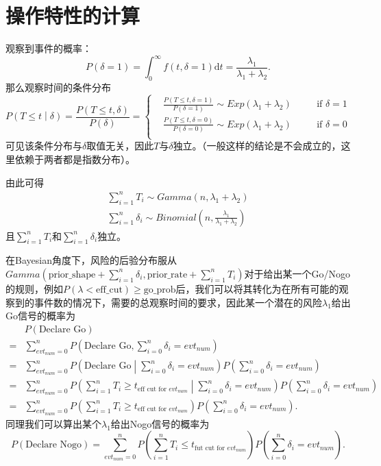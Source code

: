 \documentclass[a4paper,12pt]{article}
\begin{document}
\section{操作特性的计算}
\label{sec:computing_oc}

观察到事件的概率：
\[
  P\left(\delta = 1\right) = \int_0^\infty f\left(t, \delta = 1\right)\mathrm{d}t
  = \frac{\lambda_1}{\lambda_1 + \lambda_2}
  .
\]
那么观察时间的条件分布
\[
  P\left(T \leq t\middle|\delta\right) = \frac{P\left(T\leq t, \delta\right)}{P\left(\delta\right)}
  = \left\{
    \begin{aligned}
          & \frac{P\left(T\leq t, \delta = 1\right)}{P\left(\delta = 1\right)}
    \sim Exp\left(\lambda_1 + \lambda_2\right)
    &&\quad \text{if } \delta = 1    \\
    & \frac{P\left(T\leq t, \delta = 0\right)}{P\left(\delta = 0\right)}
    \sim Exp\left(\lambda_1 + \lambda_2\right)
    &&\quad \text{if } \delta = 0    \\
    \end{aligned}
  \right.
\]
可见该条件分布与$\delta$取值无关，因此$T$与$\delta$独立。（一般这样的结论是不会成立的，这里依赖于两者都是指数分布）。
\par
由此可得
\[
  \begin{aligned}
    \sum\limits_{i = 1}^nT_i \sim Gamma\left(n, \lambda_1 + \lambda_2\right)    \\
    \sum\limits_{i = 1}^n\delta_i \sim Binomial(n, \frac{\lambda_1}{\lambda_1 + \lambda_2})
  \end{aligned}
\]
且$\sum\limits_{i = 1}^nT_i$和$\sum\limits_{i = 1}^n\delta_i$独立。
\par
在Bayesian角度下，风险的后验分布服从$Gamma\left(\text{prior\_shape} + \sum\limits_{i = 1}^n\delta_i, \text{prior\_rate} + \sum\limits_{i = 1}^nT_i\right)$对于给出某一个Go/Nogo的规则，例如$P\left(\lambda < \text{eff\_cut}\right) \geq \text{go\_prob}$后，我们可以将其转化为在所有可能的观察到的事件数的情况下，需要的总观察时间的要求，因此某一个潜在的风险$\lambda_1$给出Go信号的概率为
\[
  \begin{aligned}
    & P\left(\text{Declare Go}\right)    \\
    =& \sum\limits_{evt_{num} = 0}^{n}P\left(
      \text{Declare Go}, \sum\limits_{i = 0}^n\delta_i = evt_{num}
    \right)    \\
    =& \sum\limits_{evt_{num} = 0}^{n}P\left(
      \text{Declare Go}\middle| \sum\limits_{i = 0}^n\delta_i = evt_{num}
    \right)
    P\left(\sum\limits_{i = 0}^n\delta_i = evt_{num}\right)    \\
    =& \sum\limits_{evt_{num} = 0}^{n}
    P\left(
      \sum\limits_{i = 1}^nT_i \geq t_{\text{eff cut for } evt_{num}}
      \middle| \sum\limits_{i = 0}^n\delta_i = evt_{num}
    \right)
    P\left(\sum\limits_{i = 0}^n\delta_i = evt_{num}\right)    \\
    =& \sum\limits_{evt_{num} = 0}^{n}
    P\left(
      \sum\limits_{i = 1}^nT_i \geq t_{\text{eff cut for } evt_{num}}
    \right)
    P\left(\sum\limits_{i = 0}^n\delta_i = evt_{num}\right)
    .
  \end{aligned}
\]
同理我们可以算出某个$\lambda_1$给出Nogo信号的概率为
\[
  P\left(\text{Declare Nogo}\right)
  = \sum\limits_{evt_{num} = 0}^{n}
    P\left(
      \sum\limits_{i = 1}^nT_i \leq t_{\text{fut cut for } evt_{num}}
    \right)
    P\left(\sum\limits_{i = 0}^n\delta_i = evt_{num}\right)
    .
\]






\clearpage
\appendix
\end{document}

